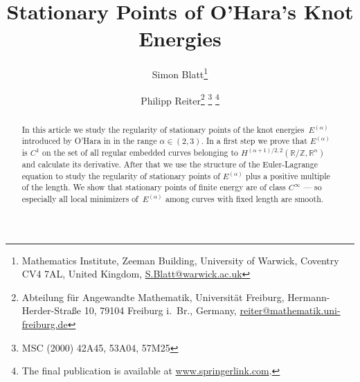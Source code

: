 \documentclass[a4paper,10pt]{article}
\title{Stationary Points of O'Hara's Knot Energies}
\author{%
 Simon Blatt\thanks{Mathematics Institute, Zeeman Building, University of Warwick, Coventry CV4 7AL, United Kingdom, \url{S.Blatt@warwick.ac.uk}} \and
 Philipp Reiter\thanks{Abteilung f\"ur Angewandte Mathematik, Universit\"at Freiburg, Hermann-Herder-Stra\ss e 10, 79104 Freiburg i.~Br., Germany, \url{reiter@mathematik.uni-freiburg.de}}%
 \footnote{MSC (2000) 42A45, 53A04, 57M25}%
 \footnote{The final publication is available at \url{www.springerlink.com}.}}
\theoremstyle{proof}
\theoremstyle{plain}
\numberwithin{equation}{section}
\renewcommand{\a}{\ensuremath{\alpha}}
\newcommand{\E}{\ensuremath{E^{(\a)}}}
\newcommand{\R}{\ensuremath{\mathbb{R}}}
\newcommand{\rzd}{\ensuremath{(\R/\Z,\R^n)}}
\newcommand{\W}[1][(\a+1)/2,2]{\ensuremath{H^{\scriptstyle #1}}}
\newcommand{\Z}{\ensuremath{\mathbb{Z}}}
\begin{document}
\maketitle


\begin{abstract}
In this article we study the regularity of stationary points of the knot energies~$\E$
introduced by O'Hara in \cite{oha:en,oha:fam-en,oha:en-func}
in the  range $\a\in(2,3)$.
In a first step we prove that $\E$ is $C^1$
on the set of all regular embedded curves belonging to  $\W\rzd$
and calculate its derivative.
After that we use the structure of the Euler-Lagrange equation to study the regularity of
stationary points of $\E$ plus a 
positive multiple of the length. We show that stationary points of finite energy are of class
$C^\infty$ --- so especially all local minimizers of~$\E$ among curves with fixed length 
are smooth.
\end{abstract}
\tableofcontents






\begin{appendix}
 
\end{appendix}


\end{document}
